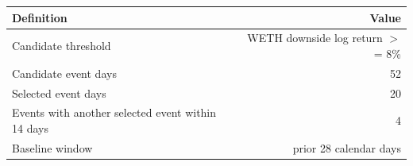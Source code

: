 \begin{tabular}{lr}
\toprule
Definition & Value \\
\midrule
Candidate threshold & WETH downside log return \ensuremath{>}= 8\% \\
Candidate event days & 52 \\
Selected event days & 20 \\
Events with another selected event within 14 days & 4 \\
Baseline window & prior 28 calendar days \\
\bottomrule
\end{tabular}
